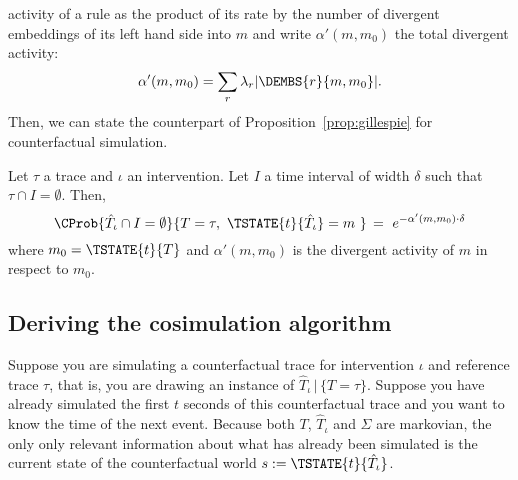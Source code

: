 activity of a rule as the product of its rate by the number of divergent
embeddings of its left hand side into $m$ and write $\alpha'(m, m_0)$
the total divergent activity:
\[\alpha'(m, m_0) = \sum_r \lambda_r |\DEMBS{r}{m, m_0}|. \] 
Then, we can state the counterpart of Proposition~\ref{prop:gillespie}
for counterfactual simulation.
\begin{proposition}\label{prop:cosim-waiting}
Let $\tau$ a trace and $\iota$ an intervention. 
Let $I$ a time interval of width $\delta$ such that 
$\tau \cap I = \emptyset$. Then,
\[
  \CProb{ \hat T_\iota \cap I = \emptyset }
        { T=\tau,\ \TSTATE{t}{\hat T_\iota} = m\ }
  \,=\ e^{-\alpha'(m, m_0) \cdot \delta}
\]
where $m_0 = \TSTATE{t}{T}$ and $\alpha'(m, m_0)$ is the divergent
activity of $m$ in respect to $m_0$.
\end{proposition}








\subsection{Deriving the cosimulation algorithm}

Suppose you are simulating a counterfactual trace for intervention $\iota$
and reference trace $\tau$, that is, you are drawing an instance of
$\hat T_\iota \,|\, \{T=\tau\}$. Suppose you have already simulated the
first $t$ seconds of this counterfactual trace and you want to know the time
of the next event. Because both $T$, $\hat T_\iota$ and $\Sigma$ are markovian,
the only only relevant information about what has already been simulated is the
current state of the counterfactual world $s := \TSTATE{t}{\hat T_\iota}$.


